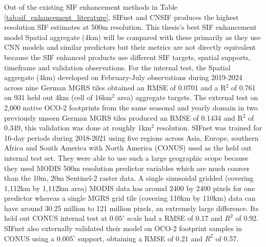 Out of the existing SIF enhancement methods in Table \ref{tab:sif_enhancement_literature}, SIFnet \cite{gensheimer2022convolutional} and CNSIF \cite{du2025cnsif} produces the highest resolution SIF estimates at 500m resolution. This thesis's best SIF enhancement model Spatial aggregate (4km) will be compared with these primarily as they use CNN models and similar predictors but their metrics are not directly equivalent because the SIF enhanced products use different SIF targets, spatial supports, timeframe and validation observations. For the internal test, the Spatial aggregate (4km) developed on February-July observations during 2019-2024 across nine German MGRS tiles obtained an RMSE of 0.0701 and a R$^2$ of 0.761 on 931 held out 4km (cell of 16km$^2$ area) aggregate targets. The external test on 2,000 native OCO-2 footprints from the same seasonal and yearly domain in two previously unseen German MGRS tiles produced an RMSE of 0.1434 and R$^2$ of 0.349, this validation was done at roughly 1km$^2$ resolution. SIFnet was trained for 16-day periods during 2018-2021 using five regions across Asia, Europe, southern Africa and South America with North America (CONUS) used as the held out internal test set. They were able to use such a large geographic scope because they used MODIS 500m resolution predictor variables which are much coarser than the 10m, 20m Sentinel-2 raster data. A single sinusoidal gridded (covering 1,112km by 1,112km area) MODIS data has around 2400 by 2400 pixels for one predictor whereas a single MGRS grid tile (covering 110km by 110km) data can have around 30.25 million to 121 million pixels, an extremely large difference. Its held out CONUS internal test at $0.05^{\circ}$ scale had a RMSE of 0.17 and $R^2$ of 0.92. SIFnet also externally validated their model on OCO-2 footprint samples in CONUS using a $0.005^{\circ}$ support, obtaining a RMSE of 0.21 and $R^2$ of 0.57. 

